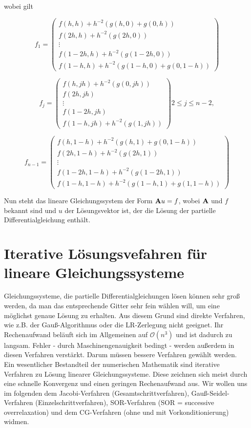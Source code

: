 wobei gilt

\begin{equation}
f_{1} = 
\begin{pmatrix}
f(h,h) + h^{-2}(g(h,0)+g(0,h)) \\
f(2h,h) + h^{-2}(g(2h,0)) \\
\vdots \\
f(1-2h,h) + h^{-2}(g(1-2h,0)) \\
f(1-h,h) + h^{-2}(g(1-h,0)+g(0,1-h))
\end{pmatrix}
\end{equation}

\begin{equation}
f_{j} = 
\begin{pmatrix}
f(h,jh) + h^{-2}(g(0,jh)) \\
f(2h,jh) \\
\vdots \\
f(1-2h,jh) \\
f(1-h,jh) + h^{-2}(g(1,jh))
\end{pmatrix}
2 \le j \le n-2,
\end{equation}

\begin{equation}
f_{n-1} = 
\begin{pmatrix}
f(h,1-h) + h^{-2}(g(h,1)+g(0,1-h)) \\
f(2h,1-h) + h^{-2}(g(2h,1)) \\
\vdots \\
f(1-2h,1-h) + h^{-2}(g(1-2h,1)) \\
f(1-h,1-h) + h^{-2}(g(1-h,1)+g(1,1-h))
\end{pmatrix}
\end{equation}

Nun steht das lineare Gleichungssystem der Form ${\textbf{A}}u = f$, wobei ${\textbf{A}}$ und $f$ bekannt sind und $u$ der Lösungsvektor ist, der die Lösung der partielle Differentialgleichung enthält.

\chapter{Iterative Lösungsvefahren für lineare Gleichungssysteme}\label{c.IterativeVerfahren}

Gleichungssysteme, die partielle Differentialgleichungen lösen können sehr groß werden, da man das entsprechende Gitter sehr fein wählen will, um eine möglichst genaue Lösung zu erhalten. Aus diesem Grund sind direkte Verfahren, wie z.B. der Gauß-Algorithmus oder die LR-Zerlegung nicht geeignet. Ihr Rechenaufwand beläuft sich im Allgemeinen auf $\mathcal{O}(n^{3})$ und ist dadurch zu langsam. Fehler - durch Maschinengenauigkeit bedingt - werden außerdem in diesen Verfahren verstärkt. Darum müssen bessere Verfahren gewählt werden. \\
Ein wesentlicher Bestandteil der numerischen Mathematik sind iterative Verfahren zu Lösung linearer Gleichungssysteme. Diese zeichnen sich meist durch eine schnelle Konvergenz und einen geringen Rechenaufwand aus. Wir wollen uns im folgenden dem Jacobi-Verfahren (Gesamtschrittverfahren), Gauß-Seidel-Verfahren (Einzelschrittverfahren), SOR-Verfahren (SOR = successive overrelaxation) und dem CG-Verfahren (ohne und mit Vorkonditionierung) widmen.

